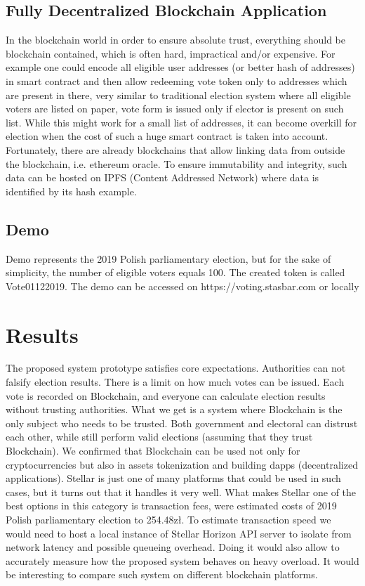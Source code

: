 \documentclass[runningheads]{llncs}
\begin{document}
\subsection{Fully Decentralized Blockchain Application}
In the blockchain world in order to ensure absolute trust, everything should be blockchain contained, which is often hard, impractical and/or expensive. For example one could encode all eligible user addresses (or better hash of addresses) in smart contract and then allow redeeming vote token only to addresses which are present in there, very similar to traditional election system where all eligible voters are listed on paper, vote form is issued only if elector is present on such list. While this might work for a small list of addresses, it can become overkill for election when the cost of such a huge smart contract is taken into account. Fortunately, there are already blockchains that allow linking data from outside the blockchain, i.e. ethereum oracle. To ensure immutability and integrity, such data can be hosted on IPFS (Content Addressed Network) where data is identified by its hash example.

\subsection{Demo}
Demo represents the 2019 Polish parliamentary election, but for the sake of simplicity, the number of eligible voters equals 100. The created token is called Vote01122019. The demo can be accessed on https://voting.stasbar.com or locally

\section{Results}
The proposed system prototype satisfies core expectations. Authorities can not falsify election results. There is a limit on how much votes can be issued. Each vote is recorded on Blockchain, and everyone can calculate election results without trusting authorities. What we get is a system where Blockchain is the only subject who needs to be trusted. Both government and electoral can distrust each other, while still perform valid elections (assuming that they trust Blockchain). We confirmed that Blockchain can be used not only for cryptocurrencies but also in assets tokenization and building dapps (decentralized applications). Stellar is just one of many platforms that could be used in such cases, but it turns out that it handles it very well. What makes Stellar one of the best options in this category is transaction fees, were estimated costs of 2019 Polish parliamentary election to 254.48zł. To estimate transaction speed we would need to host a local instance of Stellar Horizon API server to isolate from network latency and possible queueing overhead. Doing it would also allow to accurately measure how the proposed system behaves on heavy overload. It would be interesting to compare such system on different blockchain platforms.
\end{document}
